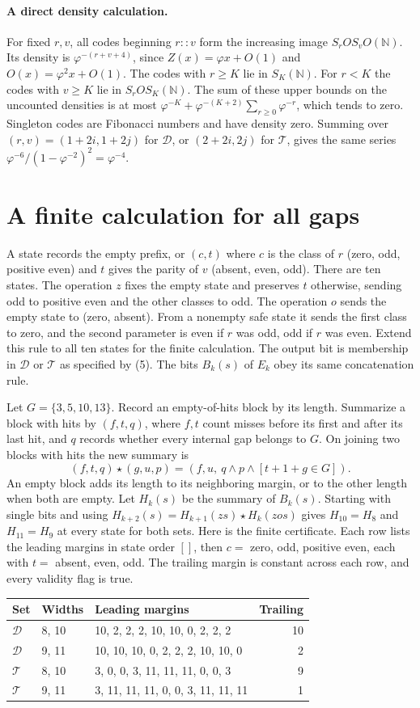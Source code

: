 \documentclass[11pt]{article}
\newcommand{\N}{\mathbb N}
\newcommand{\D}{\mathcal D}
\newcommand{\T}{\mathcal T}
\newcommand{\ph}{\varphi}
\newcommand{\G}{\{3,5,10,13\}}
\begin{document}
\paragraph{A direct density calculation.}
For fixed $r,v$, all codes beginning $r::v$ form the increasing image
$S_r O S_v O(\N)$. Its density is $\ph^{-(r+v+4)}$, since
$Z(x)=\ph x+O(1)$ and $O(x)=\ph^2x+O(1)$. The codes with $r\ge K$ lie in
$S_K(\N)$. For $r<K$ the codes with $v\ge K$ lie in
$S_r O S_K(\N)$. The sum of these upper bounds on the uncounted densities
is at most $\ph^{-K}+\ph^{-(K+2)}\sum_{r\ge0}\ph^{-r}$, which tends to zero.
Singleton codes are Fibonacci numbers and have density zero.
Summing over $(r,v)=(1+2i,1+2j)$ for $\D$, or $(2+2i,2j)$ for $\T$,
gives the same series $\ph^{-6}/(1-\ph^{-2})^2=\ph^{-4}$.

\newpage
\section{A finite calculation for all gaps}\label{sec:gaps}
A state records the empty prefix, or $(c,t)$ where $c$ is the class of $r$
(zero, odd, positive even) and $t$ gives the parity of $v$ (absent, even,
odd). There are ten states. The operation $z$ fixes the empty state and
preserves $t$ otherwise, sending odd to
positive even and the other classes to odd. The operation $o$ sends the
empty state to (zero, absent). From a nonempty safe state it sends the
first class to zero, and the second parameter is even if $r$ was odd,
odd if $r$ was even. Extend this rule to all ten states for the finite
calculation. The output bit is membership in $\D$ or $\T$ as specified
by (5). The bits $B_k(s)$ of $E_k$ obey its same concatenation rule.

Let $G=\G$. Record an empty-of-hits block by its length. Summarize a block
with hits by $(f,t,q)$, where $f,t$ count misses before its first and after
its last hit, and $q$ records whether every internal gap belongs to $G$.
On joining two blocks with hits the new summary is
\[
 (f,t,q)\star(g,u,p)=(f,u,\ q\wedge p\wedge[t+1+g\in G]).
\]
An empty block adds its length to its neighboring margin, or to the other
length when both are empty. Let $H_k(s)$ be the summary of $B_k(s)$.
Starting with single bits and using
$H_{k+2}(s)=H_{k+1}(zs)\star H_k(zos)$ gives
$H_{10}=H_8$ and $H_{11}=H_9$ at every state for both sets.
Here is the finite certificate. Each row lists the leading margins in state
order $[]$, then $c=$ zero, odd, positive even, each with $t=$ absent,
even, odd. The trailing margin is constant across each row, and every
validity flag is true.
\begin{center}\small
\begin{tabular}{@{}lllr@{}}
\toprule
Set&Widths&Leading margins&Trailing\\ \midrule
$\D$&8, 10&10, 2, 2, 2, 10, 10, 0, 2, 2, 2&10\\
$\D$&9, 11&10, 10, 10, 0, 2, 2, 2, 10, 10, 0&2\\
$\T$&8, 10&3, 0, 0, 3, 11, 11, 11, 0, 0, 3&9\\
$\T$&9, 11&3, 11, 11, 11, 0, 0, 3, 11, 11, 11&1\\
\bottomrule
\end{tabular}
\end{center}
\end{document}
